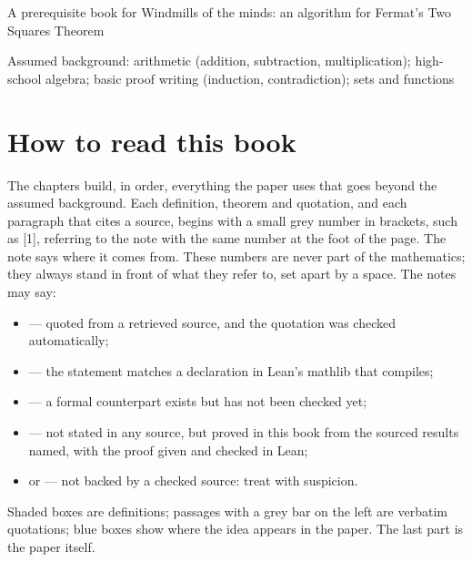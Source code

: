 \documentclass[11pt,letterpaper,openright]{book}
\begin{document}
\frontmatter
\begin{titlepage}\centering
\vspace*{2in}{\Huge Windmills: A Prerequisite Book\par}\vspace{0.4in}
{\Large A prerequisite book for Windmills of the minds: an algorithm for Fermat's Two Squares Theorem\par}\vspace{0.2in}{\large Hing Lun Chan\par}
\vfill{\small Assumed background: arithmetic (addition, subtraction, multiplication); high-school algebra; basic proof writing (induction, contradiction); sets and functions\par}
\end{titlepage}
\tableofcontents
\chapter*{How to read this book}
The chapters build, in order, everything the paper uses that goes beyond the assumed background.
Each definition, theorem and quotation, and each paragraph that cites a source, begins with a
small grey number in brackets, such as \textcolor{srcgray}{\footnotesize[1]}, referring to the note
with the same number at the foot of the page. The note says where it comes from. These numbers
are never part of the mathematics; they always stand in front of what they refer to, set apart by
a space. The notes may say:
\begin{itemize}
\item {} --- quoted from a retrieved source, and the quotation was checked automatically;
\item {} --- the statement matches a declaration in Lean's mathlib that compiles;
\item {} --- a formal counterpart exists but has not been checked yet;
\item {} --- not stated in any source, but proved in this book from the sourced results named, with the proof given and checked in Lean;
\item \unsourced{} or  --- not backed by a checked source: treat with suspicion.
\end{itemize}
Shaded boxes are definitions; passages with a grey bar on the left are verbatim quotations;
blue boxes show where the idea appears in the paper. The last part is the paper itself.
\mainmatter


\backmatter
\end{document}
